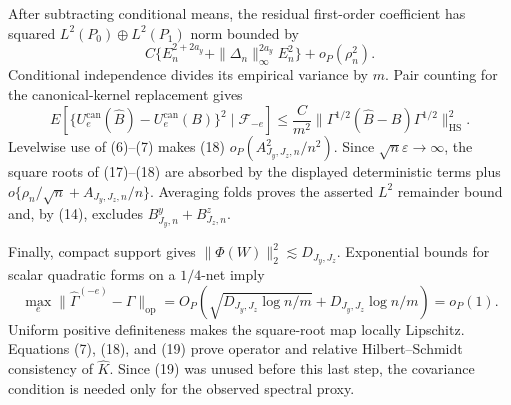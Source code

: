 After subtracting conditional means, the residual first-order coefficient has squared \(L^2(P_0)\oplus L^2(P_1)\) norm bounded by
\[
C\{E_n^{2+2a_y}+\|\Delta_n\|_\infty^{2a_y}E_n^2\}+o_P(\rho_n^2). \tag{17}
\]
Conditional independence divides its empirical variance by \(m\).  Pair counting for the canonical-kernel replacement gives
\[
E[\{U_e^{\mathrm{can}}(\widehat B)-U_e^{\mathrm{can}}(B)\}^2\mid\mathscr F_{-e}]
\le\frac C{m^2}\|\Gamma^{1/2}(\widehat B-B)\Gamma^{1/2}\|_{\mathrm{HS}}^2. \tag{18}
\]
Levelwise use of (6)--(7) makes (18) \(o_P(A_{J_y,J_z,n}^2/n^2)\).  Since \(\sqrt n\varepsilon\to\infty\), the square roots of (17)--(18) are absorbed by the displayed deterministic terms plus \(o\{\rho_n/\sqrt n+A_{J_y,J_z,n}/n\}\).  Averaging folds proves the asserted \(L^2\) remainder bound and, by (14), excludes \(B^y_{J_y,n}+B^z_{J_z,n}\).

Finally, compact support gives \(\|\Phi(W)\|_2^2\lesssim D_{J_y,J_z}\).  Exponential bounds for scalar quadratic forms on a \(1/4\)-net imply
\[
\max_e\|\widehat\Gamma^{(-e)}-\Gamma\|_{\mathrm{op}}
=O_P\!\left(\sqrt{D_{J_y,J_z}\log n/m}+D_{J_y,J_z}\log n/m\right)=o_P(1). \tag{19}
\]
Uniform positive definiteness makes the square-root map locally Lipschitz.  Equations (7), (18), and (19) prove operator and relative Hilbert--Schmidt consistency of \(\widehat K\).  Since (19) was unused before this last step, the covariance condition is needed only for the observed spectral proxy.